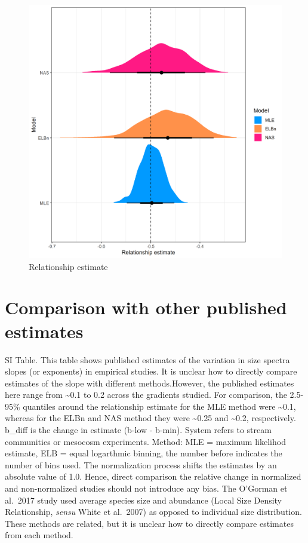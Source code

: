 \documentclass[
]{article}
\begin{document}
\begin{figure}
\centering
\includegraphics{figures/PLB_small_m_relationship_density.png}
\caption{Relationship estimate}
\end{figure}

\hypertarget{comparison-with-other-published-estimates}{%
\section{Comparison with other published
estimates}\label{comparison-with-other-published-estimates}}

SI Table. This table shows published estimates of the variation in size
spectra slopes (or exponents) in empirical studies. It is unclear how to
directly compare estimates of the slope with different methods.However,
the published estimates here range from \textasciitilde0.1 to 0.2 across
the gradients studied. For comparison, the 2.5-95\% quantiles around the
relationship estimate for the MLE method were \textasciitilde0.1,
whereas for the ELBn and NAS method they were \textasciitilde0.25 and
\textasciitilde0.2, respectively. b\_diff is the change in estimate
(b-low - b-min). System refers to stream communities or mesocosm
experiments. Method: MLE = maximum likelihod estimate, ELB = equal
logarthmic binning, the number before indicates the number of bins used.
The normalization process shifts the estimates by an absolute value of
1.0. Hence, direct comparison the relative change in normalized and
non-normalized studies should not introduce any bias. The O'Gorman et
al.~2017 study used average species size and abundance (Local Size
Density Relationship, \emph{sensu} White et al.~2007) as opposed to
individual size distribution. These methods are related, but it is
unclear how to directly compare estimates from each method.
\end{document}
